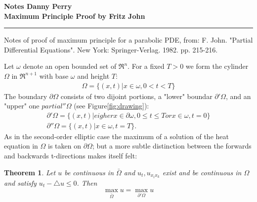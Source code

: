 \documentclass[11pt]{article}
\begin{document}
\thispagestyle{empty}
{\large{\bf Notes \hfill Danny Perry}}\\

{\LARGE{\bf Maximum Principle Proof by Fritz John}}
\vspace{0.2\baselineskip}
\hrule

Notes of proof of maximum principle for a parabolic PDE, from: F. John. "Partial Differential Equations".  New York: Springer-Verlag. 1982. pp. 215-216.


Let $\omega$ denote an open bounded set of $\Re^n$.  For a fixed $T>0$ we form the cylinder $\Omega$ in $\Re^{n+1}$ with base $\omega$ and height $T$:
\begin{align}
\Omega = \{(x,t)|x \in \omega, 0 < t < T \}
\end{align}
The boundary $\partial \Omega$ consists of two dijoint portions, a "lower" boundar $\partial'\Omega$, and an "upper" one $partial''\Omega$ (see Figure\ref{fig:drawing}):
\begin{align}
\partial'\Omega = \{(x,t)|eigher x \in \partial \omega, 0 \le t \le T or x \in \omega, t=0\} \\
\partial''\Omega = \{(x,t)|x \in \omega, t=T\}.
\end{align}
As in the second-order elliptic case the maximum of a solution of the heat equation in $\Omega$ is taken on $\partial \Omega$; but a more subtle distinction between the forwards and backwards t-directions makes itself felt:

\newtheorem{maxthrm}{Theorem}
\begin{maxthrm}
Let $u$ be continuous in $\bar{\Omega}$ and $u_t,u_{x_ix_k}$ exist and be continuous in $\Omega$ and satisfy $u_t-\triangle u \le 0$. Then
\begin{align}
\max_{\bar{\Omega}} u = \max_{\partial ' \Omega} u \label{eqn:thrm}
\end{align}
\end{maxthrm}
\end{document}
